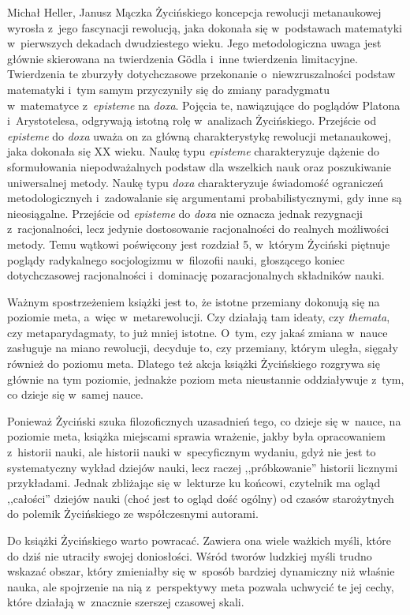 \begin{newrevplenv2auth}{Michał Heller, Janusz Mączka}
Życińskiego koncepcja rewolucji metanaukowej wyrosła z~jego fascynacji rewolucją, jaka dokonała się w~podstawach matematyki w~pierwszych dekadach dwudziestego wieku. Jego metodologiczna uwaga jest głównie skierowana na twierdzenia Gödla i~inne twierdzenia limitacyjne. Twierdzenia te zburzyły dotychczasowe przekonanie o~niewzruszalności podstaw matematyki i~tym samym przyczyniły się do zmiany paradygmatu w~matematyce z~\textit{episteme} na \textit{doxa}. Pojęcia te, nawiązujące do poglądów Platona i~Arystotelesa, odgrywają istotną rolę w~analizach Życińskiego. Przejście od \textit{episteme} do \textit{doxa} uważa on za główną charakterystykę rewolucji metanaukowej, jaka dokonała się XX wieku. Naukę typu \textit{episteme} charakteryzuje dążenie do sformułowania niepodważalnych podstaw dla wszelkich nauk oraz poszukiwanie uniwersalnej metody. Naukę typu \textit{doxa} charakteryzuje świadomość ograniczeń metodologicznych i~zadowalanie się argumentami probabilistycznymi, gdy inne są nieosiągalne. Przejście od \textit{episteme} do \textit{doxa} nie oznacza jednak rezygnacji z~racjonalności, lecz jedynie dostosowanie racjonalności do realnych możliwości metody. Temu wątkowi poświęcony jest rozdział 5, w~którym Życiński piętnuje poglądy radykalnego socjologizmu w~filozofii nauki, głoszącego koniec dotychczasowej racjonalności i~dominację pozaracjonalnych składników nauki.

Ważnym spostrzeżeniem książki jest to, że istotne przemiany dokonują się na poziomie meta, a~więc w~metarewolucji. Czy działają tam ideaty, czy \textit{themata}, czy metaparydagmaty, to już mniej istotne. O~tym, czy jakaś zmiana w~nauce zasługuje na miano rewolucji, decyduje to, czy przemiany, którym uległa, sięgały również do poziomu meta. Dlatego też akcja książki Życińskiego rozgrywa się głównie na tym poziomie, jednakże poziom meta nieustannie oddziaływuje z~tym, co dzieje się w~samej nauce.

Ponieważ Życiński szuka filozoficznych uzasadnień tego, co dzieje się w~nauce, na poziomie meta, książka miejscami sprawia wrażenie, jakby była opracowaniem z~historii nauki, ale historii nauki w~specyficznym wydaniu, gdyż nie jest to systematyczny wykład dziejów nauki, lecz raczej ,,próbkowanie'' historii licznymi przykładami. Jednak zbliżając się w~lekturze ku końcowi, czytelnik ma ogląd ,,całości'' dziejów nauki (choć jest to ogląd dość ogólny) od czasów starożytnych do polemik Życińskiego ze współczesnymi autorami.

Do książki Życińskiego warto powracać. Zawiera ona wiele ważkich myśli, które do dziś nie utraciły swojej doniosłości. Wśród tworów ludzkiej myśli trudno wskazać obszar, który zmieniałby się w~sposób bardziej dynamiczny niż właśnie nauka, ale spojrzenie na nią z~perspektywy meta pozwala uchwycić te jej cechy, które działają w~znacznie szerszej czasowej skali.





\end{newrevplenv2auth}
